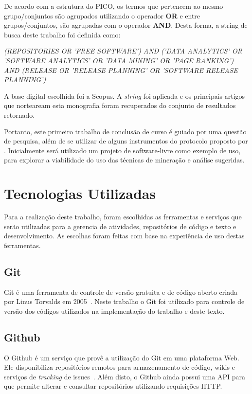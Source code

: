 De acordo com a estrutura do PICO, os termos que pertencem ao mesmo grupo/conjuntos são agrupados utilizando o operador \textbf{OR} e entre grupos/conjuntos, são agrupadas com o operador \textbf{AND}. Desta forma, a string de busca deste trabalho foi definida como:


\begin{center}
        \textit{(REPOSITORIES OR 'FREE SOFTWARE') AND ('DATA ANALYTICS' OR 'SOFTWARE ANALYTICS' OR 'DATA MINING' OR 'PAGE RANKING') AND (RELEASE OR 'RELEASE PLANNING' OR 'SOFTWARE RELEASE PLANNING')}
\end{center}

A base digital escolhida foi a Scopus. A \textit{string} foi aplicada e os principais artigos que norteaream esta monografia foram recuperados do conjunto de resultados retornado.

Portanto, este primeiro trabalho de conclusão de curso é guiado por uma questão de pesquisa, além de se utilizar de alguns instrumentos do protocolo proposto por . Inicialmente será utilizado um projeto de software-livre como exemplo de uso, para explorar a viabilidade do uso das técnicas de mineração e análise sugeridas. 

\section{Tecnologias Utilizadas}
\label{met:tec}
Para a realização deste trabalho, foram escolhidas as ferramentas e serviços que serão utilizadas para a gerencia de atividades, repositórios de código e texto e desenvolvimento. As escolhas foram feitas com base na experiência de uso destas ferramentas.

\subsection{Git}
\label{met:tec:git}
Git é uma ferramenta de controle de versão gratuita e de código aberto criada por Linus Torvalds em 2005~\cite{chacon}. Neste trabalho o Git foi utilizado para controle de versão dos códigos utilizados na implementação do trabalho e deste texto.

\subsection{Github}
\label{met:tec:github}
O Github é um serviço que provê a utilização do Git em uma plataforma Web. Ele disponibiliza repositórios remotos para armazenamento de código, wikis e serviços de \textit{tracking} de issues~\cite{github}. Além disto, o Github ainda possui uma API para que permite alterar e consultar repositórios utilizando requisições HTTP.

